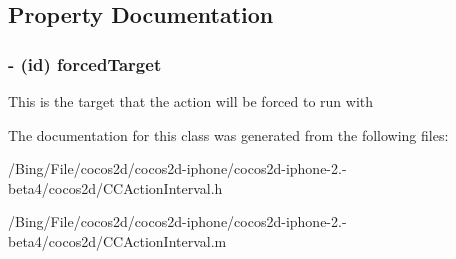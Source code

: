 \subsection{Property Documentation}
\hypertarget{interface_c_c_targeted_action_ab58161c8edf18cb22ce1077e949f5c8e}{
\subsubsection[{forced\-Target}]{\setlength{\rightskip}{0pt plus 5cm}-\/ (id) {\bf forced\-Target}}}\label{interface_c_c_targeted_action_ab58161c8edf18cb22ce1077e949f5c8e}
This is the target that the action will be forced to run with 

The documentation for this class was generated from the following files\-:\begin{DoxyCompactItemize}
\item 
/\-Bing/\-File/cocos2d/cocos2d-\/iphone/cocos2d-\/iphone-\/2.-\/beta4/cocos2d/C\-C\-Action\-Interval.\-h\item 
/\-Bing/\-File/cocos2d/cocos2d-\/iphone/cocos2d-\/iphone-\/2.-\/beta4/cocos2d/C\-C\-Action\-Interval.\-m\end{DoxyCompactItemize}
